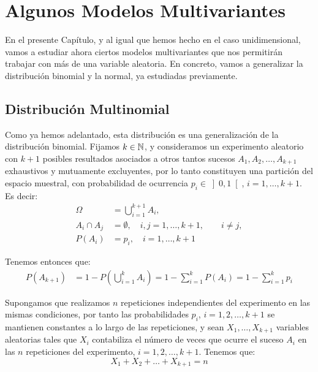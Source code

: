 \chapter{Algunos Modelos Multivariantes}

En el presente Capítulo, y al igual que hemos hecho en el caso unidimensional, vamos a estudiar ahora ciertos modelos multivariantes que nos permitirán trabajar con más de una variable aleatoria.
En concreto, vamos a generalizar la distribución binomial y la normal, ya estudiadas previamente.

\section{Distribución Multinomial}

Como ya hemos adelantado, esta distribución es una generalización de la distribución binomial.
Fijamos $k\in \mathbb{N}$, y consideramos un experimento aleatorio con $k+1$ posibles resultados asociados a otros tantos sucesos $A_1, A_2, \ldots, A_{k+1}$ exhaustivos y mutuamente excluyentes, por lo tanto constituyen una partición del espacio muestral, con probabilidad de ocurrencia $p_i \in \left]0,1\right[$, $i=1, \ldots, k+1$. Es decir:
\begin{align*}
    \Omega&=\bigcup_{i=1}^{k+1}A_i,\\
    A_i\cap A_j&=\emptyset, \quad i,j=1, \ldots, k+1,\qquad i\neq j,\\
    P(A_i)&=p_i, \quad i=1, \ldots, k+1
\end{align*}

Tenemos entonces que:
\begin{align*}
    P(A_{k+1})&=1-P\left(\bigcup_{i=1}^k A_i\right)=1-\sum_{i=1}^k P(A_i)=1-\sum_{i=1}^k p_i
\end{align*}

Supongamos que realizamos $n$ repeticiones independientes del experimento en las mismas condiciones, por tanto las probabilidades $p_i$, $i=1, 2, \ldots, k+1$ se mantienen constantes a lo largo de las repeticiones, y sean $X_1, \ldots, X_{k+1}$ variables aleatorias tales que $X_i$ contabiliza el número de veces que ocurre el suceso $A_i$ en las $n$ repeticiones del experimento, $i=1, 2, \ldots, k+1$. Tenemos que:
\begin{equation*}
    X_1+X_2+\ldots+X_{k+1}=n
\end{equation*}

